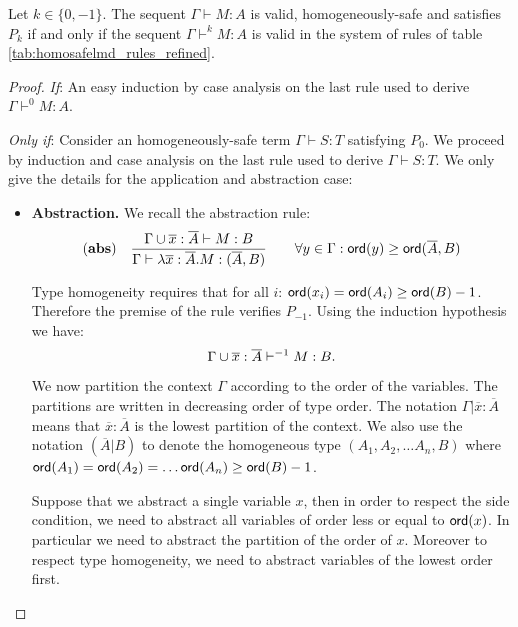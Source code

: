\begin{prop}
\label{prop:nonhomogsafe_homog_restriction}
Let $k \in \{ 0, -1 \}$. The sequent $\Gamma \vdash M : A$ is valid, homogeneously-safe and satisfies $P_k$
if and only if the sequent $\Gamma \vdash^k M : A$ is valid in the system of rules of table \ref{tab:homosafelmd_rules_refined}.
\end{prop}

\begin{proof}
\emph{If}: An easy induction by case analysis on the last rule used to derive $\Gamma \vdash^0 M : A$.

\emph{Only if}:
Consider an homogeneously-safe term $\Gamma \vdash S : T$ satisfying $P_0$.
We proceed by induction and case analysis on the last rule used to derive $\Gamma \vdash S : T$.
We only give the details for the application and abstraction
case:
\begin{itemize}
\item \textbf{Abstraction.} We recall the abstraction rule:
$$ \mathbf{(abs)} \quad  \frac{\displaystyle \Gamma \cup \overline{x} : \overline{A} \vdash M : B}{\Gamma  \vdash \lambda \overline{x} : \overline{A} . M : (\overline{A},B)} \qquad
                                   \forall y \in \Gamma : {\sf ord}(y) \geq {\sf ord}(\overline{A},B)$$

Type homogeneity requires that for all $i$: ${\sf ord}(x_i) = {\sf ord}(A_i) \geq
{\sf ord}(B) -1$. Therefore the premise of the rule verifies $P_{-1}$. Using the induction hypothesis we have:
\begin{equation}
\Gamma \cup \overline{x} : \overline{A} \vdash^{-1} M : B. \label{eq:prop:nonhomogsafe_homog_restriction:abs1}
\end{equation}

We now partition the context $\Gamma$ according to the order of
the variables. The partitions are written in decreasing order of
type order. The notation $\Gamma | \overline{x}:\overline{A}$ means
that $\overline{x}:\overline{A}$ is the lowest partition of the
context.
We also use the notation $(\overline{A}|B)$ to denote the
homogeneous type $(A_1, A_2, \ldots A_n, B)$ where ${\sf ord}(A_1) =
{\sf ord}(A_2) =  \ldots {\sf ord}(A_n) \geq {\sf ord}(B) -1$.


Suppose that we abstract a single variable $x$, then in order to
respect the side condition, we need to abstract all variables of
order less or equal to ${\sf ord}(x)$. In particular we need to abstract
the partition of the order of $x$. Moreover to respect type
homogeneity, we need to abstract variables of the lowest order
first.


\end{itemize}
\end{proof}
